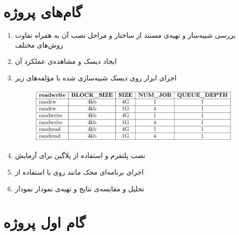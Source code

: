 \documentclass[12pt]{article}
\begin{document}
\section*{گام‌های پروژه}
\begin{enumerate}
	\item 
	بررسی شبیه‌ساز  و تهیه‌ی مستند از ساختار و مراحل نصب آن به همراه تفاوت روش‌های مختلف
	\item
ایجاد دیسک  و مشاهده‌ی عملکرد آن
	\item 
	اجرای ابزار  روی دیسک شبیه‌سازی شده با مؤلفه‌های زیر
	\begin{figure}[H]
		\centering
		\includegraphics[scale=0.65]{./table}
	\end{figure}
	\item 
	نصب پلتفرم  و استفاده از پلاگین  برای آزمایش
	\item 
	اجرای برنامه‌ای محک مانند  روی  با استفاده از 
	\item
	تحلیل و مقایسه‌ی نتایج و تهیه‌ی نمودار نمودار
\end{enumerate}

\newpage

\section*{گام اول پروژه}
\end{document}
